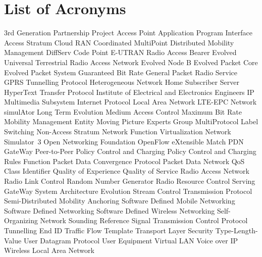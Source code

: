 \section*{List of Acronyms}

\begin{acronym}[CSMA/CA]
	\itemsep0.5pt
       {3rd Generation Partnership Project}
         {Access Point}
        {Application Program Interface}
         {Access Stratum}
      {Cloud RAN}
       {Coordinated MultiPoint}
        {Distributed Mobility Management}
       {DiffServ Code Point}
      {E-UTRAN Radio Access Bearer}
    {Evolved Universal Terrestrial Radio Access Network}
        {Evolved Node B}
        {Evolved Packet Core}
        {Evolved Packet System}
        {Guaranteed Bit Rate}
       {General Packet Radio Service}
        {GPRS Tunnelling Protocol}
     {Heterogeneous Network}
        {Home Subscriber Server}
       {HyperText Transfer Protocol}
       {Institute of Electrical and Electronics Engineers}
        {IP Multimedia Subsystem}
         {Internet Protocol}
        {Local Area Network}
       {LTE-EPC Network simulAtor}
        {Long Term Evolution}
        {Medium Access Control}
        {Maximum Bit Rate}
        {Mobility Management Entity}
       {Moving Picture Experts Group}
       {MultiProtocol Label Switching}
        {Non-Access Stratum}
        {Network Function Virtualization}
       {Network Simulator~3}
        {Open Networking Foundation}
        {OpenFlow eXtensible Match}
       {PDN GateWay}
        {Peer-to-Peer}
        {Policy Control and Charging}
       {Policy Control and Charging Rules Function}
       {Packet Data Convergence Protocol}
        {Packet Data Network}
        {QoS Class Identifier}
        {Quality of Experience}
        {Quality of Service}
        {Radio Access Network}
        {Radio Link Control}
        {Random Number Generator}
        {Radio Resource Control}
       {Serving GateWay}
        {System Architecture Evolution}
       {Stream Control Transmission Protocol}
       {Semi-Distributed Mobility Anchoring}
       {Software Defined Mobile Networking}
        {Software Defined Networking}
       {Software Defined Wireless Networking}
        {Self-Organizing Network}
        {Sounding Reference Signal}
        {Transmission Control Protocol}
       {Tunnelling End ID}
        {Traffic Flow Template}
        {Transport Layer Security}
        {Type-Length-Value}
        {User Datagram Protocol}
         {User Equipment}
       {Virtual LAN}
       {Voice over IP}
       {Wireless Local Area Network}
\end{acronym}

